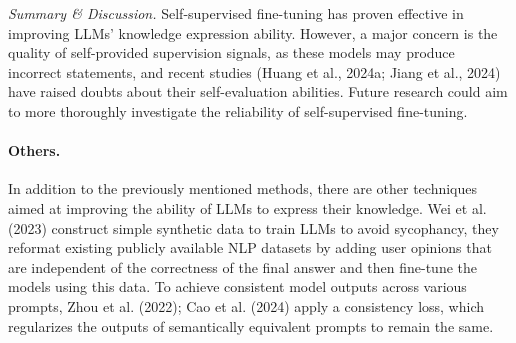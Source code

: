 \emph{Summary \& Discussion.} Self-supervised fine-tuning has proven effective in improving LLMs' knowledge expression ability. However, a major concern is the quality of self-provided supervision signals, as these models may produce incorrect statements, and recent studies (Huang et al., 2024a; Jiang et al., 2024) have raised doubts about their self-evaluation abilities. Future research could aim to more thoroughly investigate the reliability of self-supervised fine-tuning.

\paragraph{Others.} In addition to the previously mentioned methods, there are other techniques aimed at improving the ability of LLMs to express their knowledge. Wei et al. (2023) construct simple synthetic data to train LLMs to avoid sycophancy, they reformat existing publicly available NLP datasets by adding user opinions that are independent of the correctness of the final answer and then fine-tune the models using this data. To achieve consistent model outputs across various prompts, Zhou et al. (2022); Cao et al. (2024) apply a consistency loss, which regularizes the outputs of semantically equivalent prompts to remain the same.

